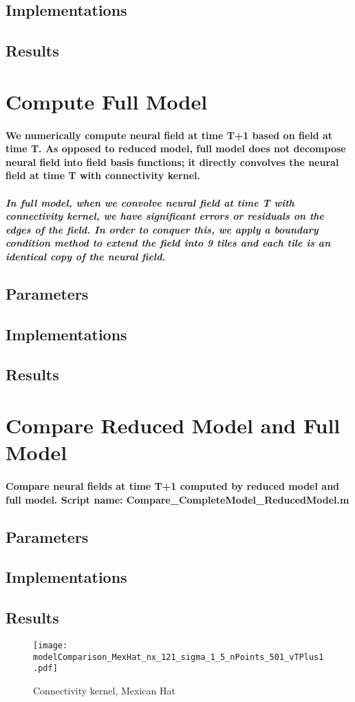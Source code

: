 \documentclass[a4paper, 12pt, english]{article}
\begin{document}
\subsection{Implementations}

\subsection{Results}



\newpage





\section{Compute Full Model}
\paragraph{We numerically compute neural field at time T+1 based on field at time T.
As opposed to reduced model, full model does not decompose neural field into field basis functions; it directly convolves
the neural field at time T with connectivity kernel.}

\subparagraph{In full model, when we convolve neural field at time T with connectivity kernel,
we have significant errors or residuals on the edges of the field. In order to conquer this,
we apply a boundary condition method to extend the field into 9 tiles and each tile is an identical copy
of the neural field.}

\subsection{Parameters}
\subsection{Implementations}
\subsection{Results}
\newpage


\section{Compare Reduced Model and Full Model}
\paragraph{Compare neural fields at time T+1 computed by reduced model and full model.\newline
Script name: Compare\_CompleteModel\_ReducedModel.m}
\subsection{Parameters}
\subsection{Implementations}
\subsection{Results}


\begin{figure}[H]
\centering
\texttt{[image: modelComparison\_MexHat\_nx\_121\_sigma\_1\_5\_nPoints\_501\_vTPlus1.pdf]}
\caption{Connectivity kernel, Mexican Hat}
\end{figure}
\end{document}
